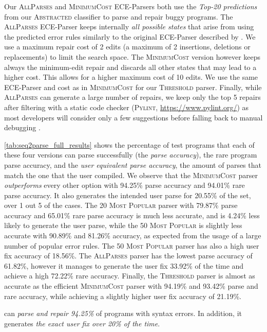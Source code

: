 Our \textsc{AllParses} and \textsc{MinimumCost} ECE-Parsers both use the
\emph{Top-20 predictions} from our \textsc{Abstracted} classifier to parse and
repair buggy programs. The \textsc{AllParses} ECE-Parser keeps internally
\emph{all possible states} that arise from using the predicted error rules
similarly to the original ECE-Parser described by \citet{Aho_1972}. We use a
maximum repair cost of 2 edits (\ie a maximum of 2 insertions, deletions or
replacements) to limit the search space. The \textsc{MinimumCost} version
however keeps always the minimum-edit repair and discards all other states that
may lead to a higher cost. This allows for a higher maximum cost of 10 edits. We
use the same ECE-Parser and cost as in \textsc{MinimumCost} for our
\textsc{Threshold} parser. Finally, while \textsc{AllParses} can generate a
large number of repairs, we keep only the top 5 repairs after filtering with a
static code checker (\textsc{Pylint}, \url{https://www.pylint.org/}) as most
developers will consider only a few suggestions before falling back to manual
debugging \citep{Kochhar2016-oc, Parnin2011-ce}.

\autoref{tab:seq2parse_full_results} shows the percentage of test programs that
each of these four versions can parse successfully (\ie the \emph{parse
accuracy}), the rare program parse accuracy, and the \emph{user equivalent parse
accuracy}, \ie the amount of parses that match the one that the user compiled.
We observe that the \textsc{MinimumCost} parser \emph{outperforms} every other
option with 94.25\% parse accuracy and 94.01\% rare parse accuracy. It also
generates the intended user parse for 20.55\% of the set, \ie over 1 out 5 of
the cases. The \textsc{20 Most Popular} parser with 79.87\% parse accuracy and
65.01\% rare parse accuracy is much less accurate, and is 4.24\% less likely to
generate the user parse, while the \textsc{50 Most Popular} is slightly less
accurate with 90.89\% and 81.26\% accuracy, as expected from the usage of a
large number of popular error rules. The \textsc{50 Most Popular} parser has
also a high user fix accuracy of 18.56\%. The \textsc{AllParses} parser has the
lowest parse accuracy of 61.82\%, however it manages to generate the user fix
33.92\% of the time and achieve a high 72.22\% rare accuracy. Finally, the
\textsc{Threshold} parser is almost as accurate as the efficient
\textsc{MinimumCost} parser with 94.19\% and 93.42\% parse and rare accuracy,
while achieving a slightly higher user fix accuracy of 21.19\%.

\begin{framed}
  \noindent \toolname can \emph{parse and repair 94.25\%} of programs with
  syntax errors. In addition, it generates \emph{the exact user fix over 20\% of
  the time}.
\end{framed}

